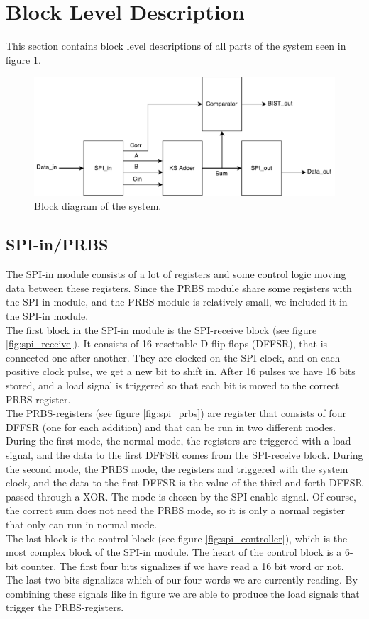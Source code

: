 \section{Block Level Description} \label{sec:block_level}
This section contains block level descriptions of all parts of the system seen in figure \ref{fig:top_level}.

\begin{figure}[H]
  \centering
  \captionsetup{justification=centering}
  \includegraphics[scale=0.5]{../figures/TOP.pdf}
  \caption{Block diagram of the system.} \label{fig:top_level}
\end{figure}


\subsection{SPI-in/PRBS}
The SPI-in module consists of a lot of registers and some control logic moving data between these registers. Since the PRBS module share some registers with the SPI-in module, and the PRBS module is relatively small, we included it in the SPI-in module. \\
The first block in the SPI-in module is the SPI-receive block (see figure \ref{fig:spi_receive}). It consists of 16 resettable D flip-flops (DFFSR), that is connected one after another. They are clocked on the SPI clock, and on each positive clock pulse, we get a new bit to shift in. After 16 pulses we have 16 bits stored, and a load signal is triggered so that each bit is moved to the correct PRBS-register. \\
The PRBS-registers (see figure \ref{fig:spi_prbs}) are register that consists of four DFFSR (one for each addition) and that can be run in two different modes. During the first mode, the normal mode, the registers are triggered with a load signal, and the data to the first DFFSR comes from the SPI-receive block. During the second mode, the PRBS mode, the registers and triggered with the system clock, and the data to the first DFFSR is the value of the third and forth DFFSR passed through a XOR. The mode is chosen by the SPI-enable signal. Of course, the correct sum does not need the PRBS mode, so it is only a normal register that only can run in normal mode.\\
The last block is the control block (see figure \ref{fig:spi_controller}), which is the most complex block of the SPI-in module. The heart of the control block is a 6-bit counter. The first four bits signalizes if we have read a 16 bit word or not. The last two bits signalizes which of our four words we are currently reading. By combining these signals like in figure we are able to produce the load signals that trigger the PRBS-registers.

